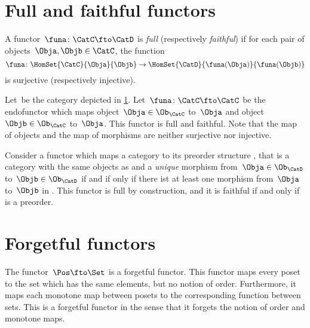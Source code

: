
\section{Full and faithful functors}

\begin{ctdefinition}
	\label{def:functorfullfaith}
	A functor~$\funa\colon \CatC \fto \CatD$ is \emph{full} (respectively \emph{faithful}) if for each pair of objects~$\Obja,\Objb\in \CatC$, the function
	\begin{equation}
		\funa \colon \HomSet{\CatC}{\Obja}{\Objb} \to \HomSet{\CatD}{\funa(\Obja)}{\funa(\Objb)}
	\end{equation}
	is surjective (respectively injective).
\end{ctdefinition}

\begin{example}
	Let~\CatC be the category depicted in \cref{fig:ex_full_faithful_1}.
	Let~$\funa\colon \CatC \fto \CatC$ be the endofunctor which maps object~$\Obja\in \Ob_{\CatC}$ to~$\Obja$ and object~$\Objb\in \Ob_{\CatC}$ to~$\Obja$.
	This functor is full and faithful.
	Note that the map of objects and the map of morphisms are neither surjective nor injective.

	\begin{figure}[h!]
		\centering
		\caption{}
		\label{fig:ex_full_faithful_1}
	\end{figure}
\end{example}

\begin{example}
	Consider a functor which maps a category \CatC to its preorder structure \CatD, that is a category with the same objects as \CatC and a \emph{unique} morphism from~$\Obja\in \Ob_\CatD$ to~$\Objb\in \Ob_\CatD$ if and if only if there ist at least one morphism from~$\Obja$ to~$\Objb$ in \CatC.
	This functor is full by construction, and it is faithful if and only if \CatC is a preorder.
\end{example}


\section{Forgetful functors}


\begin{example}
	The functor~$\Pos \fto \Set$ is a forgetful functor.
	This functor maps every poset to the set which has the same elements, but no notion of order.
	Furthermore, it maps each monotone map between posets to the corresponding function between sets.
	This is a forgetful functor in the sense that it forgets the notion of order and monotone maps.
\end{example}
